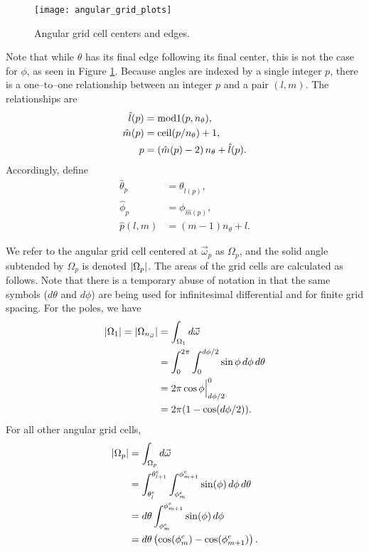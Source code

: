 \begin{figure}[h]
  \centering
  \texttt{[image: angular\_grid\_plots]}
  \caption{Angular grid cell centers and edges.}
  \label{fig:angular_grid_plots}
\end{figure}

Note that while $\theta$ has its final edge following its final center, this is
not the case for $\phi$, as seen in Figure \ref{fig:angular_grid_plots}.
Because angles are indexed by a single integer $p$, there is a one--to--one relationship between
an integer $p$ and a pair $(l,m)$.
The relationships are
\begin{align*}
  \hat{l}(p) &= \mbox{mod1}(p, n_\theta), \\
  \hat{m}(p) &= \mbox{ceil}(p/n_\theta) + 1, \\
  p &= \left( \hat{m}(p)-2\right)n_\theta + \hat{l}(p).
\end{align*}
Accordingly, define
\begin{align*}
  \hat{\theta}_p &= \theta_{\hat{l}(p)}, \\
  \hat{\phi}_p &= \phi_{\hat{m}(p)}, \\
  \hat{p}(l,m) &= (m-1)n_\theta + l.
\end{align*}

We refer to the angular grid cell centered at $\vec{\omega}_p$ as $\Omega_p$, and the solid angle subtended by $\Omega_p$ is denoted $\left| \Omega_p \right|$.
The areas of the grid cells are calculated as follows.
Note that there is a temporary abuse of notation in that the same symbols ($d\theta$ and $d\phi$) are being used for infinitesimal differential and for finite grid spacing.
For the poles, we have
\begin{align*}
  \left| \Omega_1 \right| = \left| \Omega_{n_{\vec{\omega}}} \right| &= \int_{\Omega_1} d{\vec{\omega}} \\
  &= \int_0^{2\pi}\int_0^{d\phi/2} \sin\phi\, d\phi\, d\theta \\
  &= 2\pi \cos\phi \Big|_{d\phi/2}^0 \\
  &= 2\pi(1-\cos(d\phi/2)).
\end{align*}
For all other angular grid cells,
\begin{align*}
  \left| \Omega_p \right| &= \int_{\Omega_p} d{\vec{\omega}} \\
                 &= \int_{\theta_l^e}^{\theta_{l+1}^e}\int_{\phi_m^e}^{\phi_{m+1}^e} \sin(\phi)\, d\phi\, d\theta \\
                 &= d\theta \int_{\phi_m^e}^{\phi_{m+1}^e} \sin(\phi)\, d\phi \\
                 &= d\theta\left( \cos(\phi_m^e)-\cos(\phi_{m+1}^e) \right).
\end{align*}
